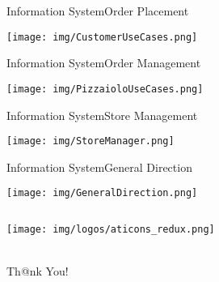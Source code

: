\documentclass{beamer}
\begin{document}
\begin{frame}{Information System}{Order Placement}
\begin{center}
 \texttt{[image: img/CustomerUseCases.png]}
\end{center}
\end{frame}

\begin{frame}{Information System}{Order Management}
\begin{center}
 \texttt{[image: img/PizzaioloUseCases.png]}
\end{center}
\end{frame}

\begin{frame}{Information System}{Store Management}
\begin{center}
 \texttt{[image: img/StoreManager.png]}
\end{center}
\end{frame}

\begin{frame}{Information System}{General Direction}
\begin{center}
 \texttt{[image: img/GeneralDirection.png]}
\end{center}
\end{frame}

\begin{frame}
  \begin{columns}[c]
  \begin{column}{4in}
   \begin{center}
    \texttt{[image: img/logos/aticons\_redux.png]}
    \begin{LARGE}
     \\Th@nk You!\\
    \end{LARGE}
   \end{center}
  \end{column}
 \end{columns}
\end{frame}
\end{document}
